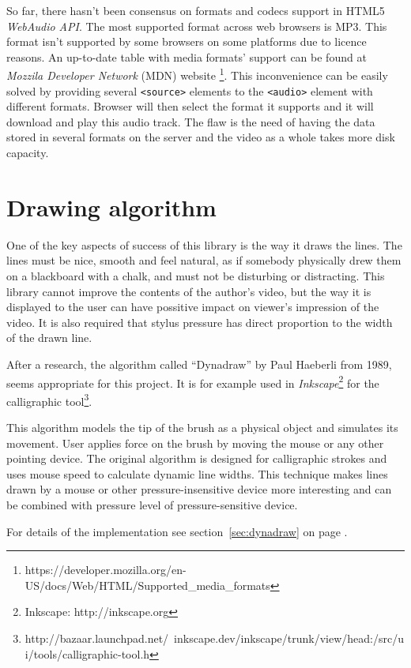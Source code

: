 So far, there hasn't been consensus on formats and codecs support in HTML5 \textit{WebAudio API}. The most supported format across web browsers is MP3. This format isn't supported by some browsers on some platforms due to licence reasons. An up-to-date table with media formats' support can be found at \textit{Mozzila Developer Network} (MDN) website  \cite{} \footnote{https://developer.mozilla.org/en-US/docs/Web/HTML/Supported\_media\_formats}. This inconvenience can be easily solved by providing several \verb|<source>| elements to the \verb|<audio>| element with different formats. Browser will then select the format it supports and it will download and play this audio track. The flaw is the need of having the data stored in several formats on the server and the video as a whole takes more disk capacity.





\section{Drawing algorithm}
One of the key aspects of success of this library is the way it draws the lines. The lines must be nice, smooth and feel natural, as if somebody physically drew them on a blackboard with a chalk, and must not be disturbing or distracting. This library cannot improve the contents of the author's video, but the way it is displayed to the user can have possitive impact on viewer's impression of the video. It is also required that stylus pressure has direct proportion to the width of the drawn line.

After a research, the algorithm called ``Dynadraw'' by Paul Haeberli \cite{dyna_draw} from 1989, seems appropriate for this project. It is for example used in \textit{Inkscape}\footnote{Inkscape: http://inkscape.org} for the calligraphic tool\footnote{http://bazaar.launchpad.net/~inkscape.dev/inkscape/trunk/view/head:/src/ui/tools/calligraphic-tool.h}.

This algorithm models the tip of the brush as a physical object and simulates its movement. User applies force on the brush by moving the mouse or any other pointing device. The original algorithm is designed for calligraphic strokes and uses mouse speed to calculate dynamic line widths. This technique makes lines drawn by a mouse or other pressure-insensitive device more interesting and can be combined with pressure level of pressure-sensitive device.

For details of the implementation see section~\ref{sec:dynadraw} on page \pageref{sec:dynadraw}.



